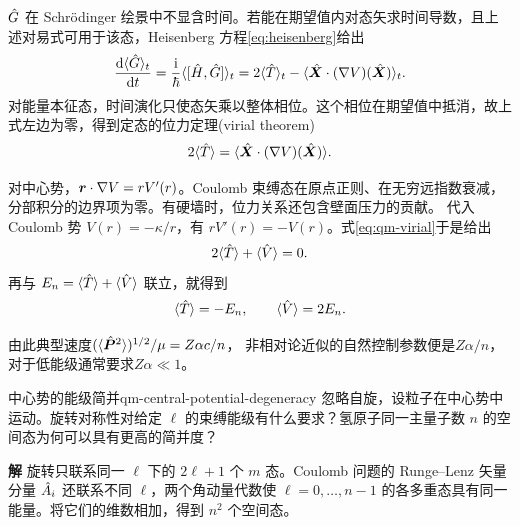$\hat{G}$ 在 Schrödinger 绘景中不显含时间。若能在期望值内对态矢求时间导数，且上述对易式可用于该态，Heisenberg 方程\eqref{eq:heisenberg}给出
\begin{equation}
    \frac{\mathop{}\!\mathrm{d}\langle\hat{G}\rangle_t}{\mathrm{d} t}
    = \frac{\mathrm{i}}{\hbar}\langle[\hat{H},\hat{G}]\rangle_t
    = 2\langle\hat{T}\rangle_t - \langle\hat{\bm{X}} \cdot (\nabla V)(\hat{\bm{X}})\rangle_t .
\end{equation}
对能量本征态，时间演化只使态矢乘以整体相位。这个相位在期望值中抵消，故上式左边为零，得到定态的位力定理(virial theorem)
\begin{equation}\label{eq:qm-virial}
    2\langle\hat{T}\rangle = \langle\hat{\bm{X}} \cdot (\nabla V)(\hat{\bm{X}})\rangle .
\end{equation}

对中心势，$\bm r \cdot \nabla V = rV'(r)$。Coulomb 束缚态在原点正则、在无穷远指数衰减，分部积分的边界项为零。有硬墙时，位力关系还包含壁面压力的贡献。
代入 Coulomb 势 $V(r) = -\kappa/r$，有 $rV'(r) = -V(r)$。式\eqref{eq:qm-virial}于是给出
\begin{equation}
    2\langle\hat{T}\rangle + \langle\hat{V}\rangle = 0 .
\end{equation}
再与 $E_n = \langle\hat{T}\rangle + \langle\hat{V}\rangle$ 联立，就得到
\begin{equation}
    \langle\hat{T}\rangle = -E_n,\qquad \langle\hat{V}\rangle = 2E_n .
\end{equation}

由此典型速度$(\langle\hat{\bm{P}}^2\rangle)^{1/2}/\mu = Z\alpha c/n$，
非相对论近似的自然控制参数便是$Z\alpha/n$，对于低能级通常要求$Z\alpha \ll 1$。

\begin{example}{中心势的能级简并}{qm-central-potential-degeneracy}
    忽略自旋，设粒子在中心势中运动。旋转对称性对给定 $\ell$ 的束缚能级有什么要求？氢原子同一主量子数 $n$ 的空间态为何可以具有更高的简并度？
    \par\smallskip\textbf{解}\quad
    旋转只联系同一 $\ell$ 下的 $2\ell + 1$ 个 $m$ 态。Coulomb 问题的 Runge--Lenz 矢量分量 $\hat{A}_i$ 还联系不同 $\ell$，两个角动量代数使 $\ell = 0,\ldots,n - 1$ 的各多重态具有同一能量。将它们的维数相加，得到 $n^2$ 个空间态。
\end{example}
